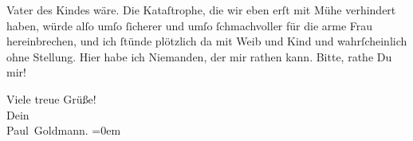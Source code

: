                Vater des Kindes
               wäre. Die Kataſtrophe, die wir eben erſt mit Mühe verhindert haben, würde alſo umſo{ }ſicherer \strikeout{\textcolor{gray}{×}\-\textcolor{gray}{×}} und umſo{ }ſchmachvoller für die arme Frau hereinbrechen, und ich{ }ſtünde plötzlich da mit Weib und
               Kind und wahrſcheinlich ohne Stellung. Hier habe ich Niemanden, der mir rathen kann.
                  {\pb}Bitte, rathe Du mir!\pend
           
\pstart
           Viele treue Grüße! {\\[\baselineskip]}Dein {\\[\baselineskip]}\spacefill\mbox{Paul Goldmann.}\pend
           \leftskip=0em{}\endnumbering{}  \newcommand{\dateiname}{L02895}\newcommand{\titel}{Paul Goldmann an Arthur Schnitzler, 27. 11. [1899]}\newcommand{\editorInnen}{Martin Anton Müller und Laura Untner}
